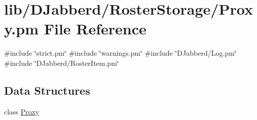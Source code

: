 \hypertarget{_roster_storage_2_proxy_8pm}{
\section{lib/\-D\-Jabberd/\-Roster\-Storage/\-Proxy.pm \-File \-Reference}
\label{_roster_storage_2_proxy_8pm}
}
{\ttfamily \#include \char`\"{}strict.\-pm\char`\"{}}\*
{\ttfamily \#include \char`\"{}warnings.\-pm\char`\"{}}\*
{\ttfamily \#include \char`\"{}\-D\-Jabberd/\-Log.\-pm\char`\"{}}\*
{\ttfamily \#include \char`\"{}\-D\-Jabberd/\-Roster\-Item.\-pm\char`\"{}}\*
\subsection*{\-Data \-Structures}
\begin{DoxyCompactItemize}
\item 
class \hyperlink{class_d_jabberd_1_1_roster_storage_1_1_proxy}{\-Proxy}
\end{DoxyCompactItemize}
